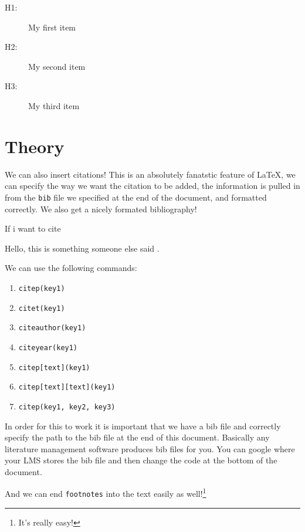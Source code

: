 \documentclass{article}
\begin{document}
\begin{description}
    \item[H1:] My first item
    \item[H2:] My second item
    \item[H3:] My third item
\end{description} 

\newpage
\section{Theory}
\label{sec:theory}

We can also insert citations! This is an absolutely fanatstic feature of \LaTeX, we can specify the way we want the citation to be added, the information is pulled in from the \texttt{bib} file we specified at the end of the document, and formatted correctly. We also get a nicely formated bibliography!

If i want to cite \citep{lee2019machine}

Hello, this is something someone else said \citep{lee2019machine}.

We can use the following commands:
\begin{enumerate}
    \item \texttt{citep(key1)} \citep{smith2020impact}
    \item \texttt{citet(key1)} \citet{smith2020impact}
    \item \texttt{citeauthor(key1)} \citeauthor{smith2020impact}
    \item \texttt{citeyear(key1)} \citeyear{smith2020impact}
    \item \texttt{citep[text](key1)} \citep[pp.20]{smith2020impact}
    \item \texttt{citep[text][text](key1)} \citep[for example][pp.20]{smith2020impact}
    \item \texttt{citep(key1, key2, key3)} \citep{smith2020impact,brown2018statistics,lee2019machine}
\end{enumerate}


In order for this to work it is important that we have a bib file and correctly specify the path to the bib file at the end of this document. Basically any literature management software produces bib files for you. You can google where your LMS stores the bib file and then change the code at the bottom of the document.


And we can end \texttt{footnotes} into the text easily as well!\footnote{It's really easy!}
\end{document}
